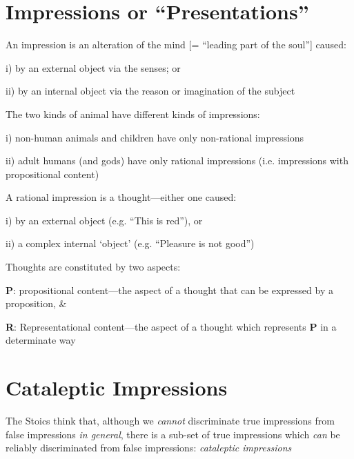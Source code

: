 \documentclass[11pt]{article}
\begin{document}
\section*{Impressions or ``Presentations''}

\noindent An impression is an alteration of the mind [= ``leading part of the soul''] caused:
\vspace*{2mm}

i) by an external object via the senses; or
\vspace*{1mm}

ii) by an internal object via the reason or imagination of the subject
\vspace*{2mm}

\noindent The two kinds of animal have different kinds of impressions:
\vspace*{2mm}

i) non-human animals and children have only non-rational impressions
\vspace*{1mm}

ii) adult humans (and gods) have only rational impressions (i.e. impressions with propositional content)
\vspace*{2mm}

\noindent A rational impression is a thought---either one caused:
\vspace*{2mm}

i) by an external object (e.g. ``This is red''), or
\vspace*{1mm}

ii) a complex internal `object' (e.g. ``Pleasure is not good'')
\vspace*{2mm}

\noindent Thoughts are constituted by two aspects:
\vspace*{2mm}

\textbf{P}: propositional content---the aspect of a thought that can be expressed by a proposition, \&
\vspace*{1mm}

\textbf{R}: Representational content---the aspect of a thought which represents \textbf{P} in a determinate way
\vspace*{-2mm}

\section*{Cataleptic Impressions}

\noindent The Stoics think that, although we \emph{cannot} discriminate true impressions from false impressions \emph{in general}, there is a sub-set of true impressions which \emph{can} be reliably discriminated from false impressions: \emph{cataleptic impressions}
\newpage
\end{document}
